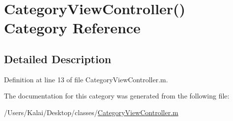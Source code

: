 \hypertarget{category_category_view_controller_07_08}{\section{Category\-View\-Controller() Category Reference}
\label{category_category_view_controller_07_08}
}


\subsection{Detailed Description}


Definition at line 13 of file Category\-View\-Controller.\-m.



The documentation for this category was generated from the following file\-:\begin{DoxyCompactItemize}
\item 
/\-Users/\-Kalai/\-Desktop/classes/\hyperlink{_category_view_controller_8m}{Category\-View\-Controller.\-m}\end{DoxyCompactItemize}
